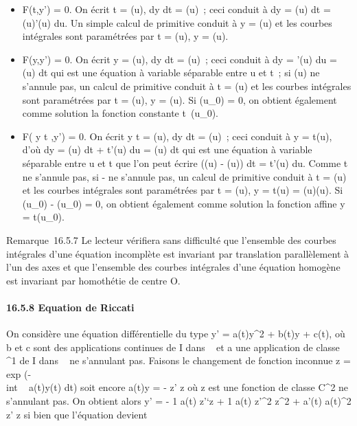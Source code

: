 \documentclass[]{article}
\begin{document}
\begin{itemize}
\itemsep1pt\parskip0pt
\item
  F(t,y') = 0. On écrit t = \phi(u),  dy \over dt =
  \psi(u)~; ceci conduit à dy = \psi(u) dt = \psi(u)\phi'(u) du. Un simple calcul de
  primitive conduit à y = \Psi(u) et les courbes intégrales sont
  paramétrées par t = \phi(u), y = \Psi(u).
\item
  F(y,y') = 0. On écrit y = \phi(u),  dy \over dt =
  \psi(u)~; ceci conduit à dy = \phi'(u) du = \psi(u) dt qui est une équation à
  variable séparable entre u et t~; si \psi(u) ne s'annule pas, un calcul
  de primitive conduit à t = \Phi(u) et les courbes intégrales sont
  paramétrées par t = \Phi(u), y = \psi(u). Si \phi(u\_0) = 0, on obtient
  également comme solution la fonction constante
  t\mapsto~\phi(u\_0).
\item
  F( y \over t ,y') = 0. On écrit  y
  \over t = \phi(u),  dy \over dt =
  \psi(u)~; ceci conduit à y = t\phi(u), d'où dy = \phi(u) dt + t\phi'(u) du = \psi(u)
  dt qui est une équation à variable séparable entre u et t que l'on
  peut écrire (\psi(u) - \phi(u)) dt = t\phi'(u) du. Comme t ne s'annule pas, si
  \psi - \phi ne s'annule pas, un calcul de primitive conduit à t = \Phi(u) et
  les courbes intégrales sont paramétrées par t = \Phi(u), y = t\psi(u) =
  \Phi(u)\psi(u). Si \psi(u\_0) - \phi(u\_0) = 0, on obtient
  également comme solution la fonction affine y = t\phi(u\_0).
\end{itemize}

Remarque~16.5.7 Le lecteur vérifiera sans difficulté que l'ensemble des
courbes intégrales d'une équation incomplète est invariant par
translation parallèlement à l'un des axes et que l'ensemble des courbes
intégrales d'une équation homogène est invariant par homothétie de
centre O.

\paragraph{16.5.8 Equation de Riccati}

On considère une équation différentielle du type y' = a(t)y^2
+ b(t)y + c(t), où b et c sont des applications continues de I dans ~ et
a une application de classe ^1 de I dans ~ ne s'annulant
pas. Faisons le changement de fonction inconnue z
= exp (-\\int ~ a(t)y(t)
dt) soit encore a(t)y = - z' \over z où z est une
fonction de classe C^2 ne s'annulant pas. On obtient alors y'
= - 1 \over a(t)  z'`\over z + 1
\over a(t)  z'^2 \over
z^2 + a'(t) \over a(t)^2 
z' \over z si bien que l'équation devient
\end{document}
